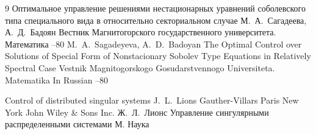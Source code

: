 \begin{thebibliography}{9}
\paper Оптимальное управление решениями нестационарных уравнений соболевского типа специального вида в относительно секториальном случае
\by М.~А.~Сагадеева, А.~Д.~Бадоян
\jour  Вестник Магнитогорского государственного университета. Математика
--80
\misctransl
\by M.~A.~Sagadeyeva, A.~D.~Badoyan
\paper The Optimal Control over Solutions of Special Form of Nonstacionary Sobolev Type Equations in Relatively Spectral Case 
\jour Vestnik Magnitogorskogo Gosudarstvennogo Universiteta. Matematika
\miscnote In Russian
--80


\book Control of distributed singular systems 
\by J.~L.~Lions 
\publ Gauther-Villars
\publaddr Paris
\moreref
\publaddr New York
\publ John Wiley \& Sons Inc.
\rtransl
\by Ж.~Л.~Лионс
\book Управление сингулярными распределенными системами
\publaddr М.
\publ Наука





\end{thebibliography}

%

\renewcommand{\correctvfill}{\newpage}
%
%
\makeentitle

\renewcommand{\baselinestretch}{0.9}




 \newpage
%
%
%

